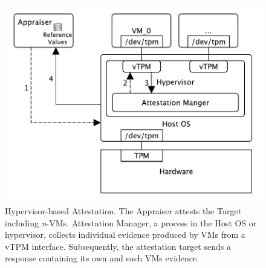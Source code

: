 \begin{figure}[!ht]
  \centering
  \includegraphics[scale=0.35]{figures/type3attest.pdf}
  \caption{Hypervisor-based Attestation. The Appraiser attests the Target including \emph{n}-VMs. Attestation Manager, a process in the Host OS or hypervisor, collects individual evidence produced by VMs from a vTPM interface. Subsequently, the attestation target sends a response containing its own and each VMs evidence.}
  \label{fig:type3attest}
\end{figure}

